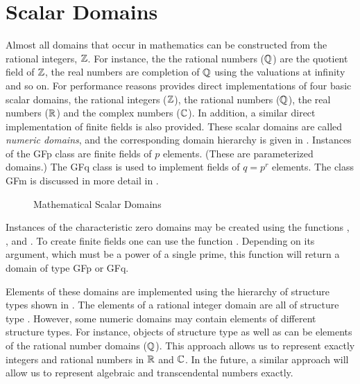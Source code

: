 \chapter{Scalar Domains}
\label{Scalar:Chap}

Almost all domains that occur in mathematics can be constructed from
the rational integers, ${\Bbb Z}$.  For instance, the the rational numbers
(${\Bbb Q}$) are the quotient field of ${\Bbb Z}$, the real numbers are completion
of ${\Bbb Q}$ using the valuations at infinity and so on.  For performance
reasons provides direct implementations of four basic scalar
domains, the rational integers (${\Bbb Z}$), the rational numbers (${\Bbb Q}$), the
real numbers (${\Bbb R}$) and the complex numbers (${\Bbb C}$).  In addition, a
similar direct implementation of finite fields is also provided.
These scalar domains are called {\em numeric domains}, and the
corresponding domain hierarchy is given in .
Instances of the {\sf GFp} class are finite fields of $p$ elements.
(These are parameterized domains.)  The {\sf GFq} class is used to
implement fields of $q= p^r$ elements.  The class {\sf GFm} is
discussed in more detail in .

\begin{figure}
\begin{center}
\end{center}
\caption{Mathematical Scalar Domains\label{NumberDomains:Fig}}
\end{figure}

Instances of the characteristic zero domains may be created using the
functions ,
,  and
.  To create finite fields one can use
the function .  Depending on its argument,
which must be a power of a single prime, this function will return a
domain of type {\sf GFp} or {\sf GFq}.

Elements of these domains are implemented using the hierarchy of
structure types shown in .  The elements of
a rational integer domain are all of structure type
.  However, some numeric domains may contain
elements of different structure types.  For instance, objects of
structure type  as well as
 can be elements of the rational number
domains (${\Bbb Q}$).  This approach allows us to represent exactly integers
and rational numbers in ${\Bbb R}$ and ${\Bbb C}$.  In the future, a similar
approach will allow us to represent algebraic and transcendental
numbers exactly.

